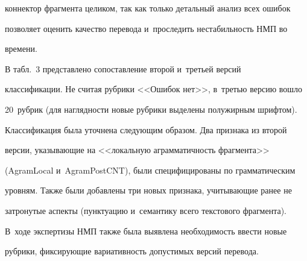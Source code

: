 коннектор фрагмента целиком, так как только детальный анализ всех ошибок 


позволяет оценить качество перевода и~проследить нестабильность НМП во 


времени.


  


  В табл.~3 представлено сопоставление второй и~третьей версий 


классификации. Не считая рубрики <<Ошибок нет>>, в~третью версию вошло 


20~рубрик (для наглядности новые рубрики выделены полужирным шрифтом). 


Классификация была уточнена следующим образом. Два признака из второй 


версии, указывающие на <<локальную аграмматичность фрагмента>> 


(AgramLocal и~AgramPostCNT), были специфицированы по грамматическим 


уровням. Также были добавлены три новых признака, учитывающие ранее не 


затронутые аспекты (пунктуацию и~семантику всего текстового фрагмента). 


В~ходе экспертизы НМП также была выявлена необходимость ввести новые 


рубрики, фиксирующие вариативность допустимых версий перевода.


   


